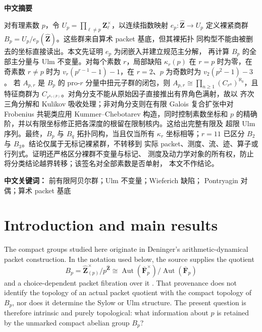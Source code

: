 \documentclass[11pt]{article}
\theoremstyle{definition}
\begin{document}
\begin{center}
\textbf{中文摘要}
\end{center}
\begingroup\small
\noindent
对有理素数 $p$，令
$U_p=\prod_{\ell\ne p}\mathbf Z_\ell^\times$，以连续指数映射
$e_p:\widehat{\mathbf Z}\to U_p$ 定义裸紧商群
$B_p=U_p/e_p(\widehat{\mathbf Z})$。这些群来自算术 packet 基底，但其裸拓扑
同构型不能由被删去的坐标直接读出。本文先证明 $e_p$ 为闭嵌入并建立规范主分解，
再计算 $B_p$ 的全部主分量与 Ulm 不变量。对每个素数 $r$，局部缺陷
$\kappa_r(p)$ 在 $r=p$ 时为零，在奇素数 $r\ne p$ 时为
$v_r(p^{r-1}-1)-1$，在 $r=2$、$p$ 为奇数时为 $v_2(p^2-1)-3$。
若 $A_{p,r}$ 是 $B_p$ 的 pro-$r$ 分量中扭元子群的闭包，则
$A_{p,r}\cong\prod_{n\ge1}(C_{r^n})^{\aleph_0}$，且特征商群为
$C_{r^{\kappa_r(p)}}$。对角分支不能从原始因子直接推出有界角色满射，故以
齐次三角分解和 Kulikov 吸收处理；非对角分支则在有限 Galois 复合扩张中对
Frobenius 共轭类应用 Kummer--Chebotarev 构造，同时控制素数坐标和
$p$ 的精确阶，并以有限坐标修正把各深度的根留在限制核内。这给出完整有限及
超限 Ulm 序列。最终，$B_p$ 与 $B_q$ 拓扑同构，当且仅当所有 $\kappa_r$
坐标相等；$r=11$ 已区分 $B_2$ 与 $B_3$。结论仅属于无标记裸紧群，不转移到
实际 packet、测度、流、迹、算子或行列式。证明还严格区分裸群不变量与标记、
测度及动力学对象的所有权，防止将分类结论越界转移；该签名对全部素数是否单射，
本文不作结论。

\medskip
\noindent\textbf{中文关键词：} 前有限阿贝尔群；Ulm 不变量；Wieferich 缺陷；
Pontryagin 对偶；算术 packet 基底
\endgroup

\section{Introduction and main results}\label{sec:introduction}

The compact groups studied here originate in Deninger's arithmetic-dynamical
packet construction.  In the notation used below, the source supplies the
quotient
\[
 B_p=\widehat{\mathbf Z}_{(p)}^{\times}/p^{\widehat{\mathbf Z}}
     \cong \operatorname{Aut}(\overline{\mathbf F}_p^{\times})/
             \operatorname{Aut}(\overline{\mathbf F}_p)
\]
and a choice-dependent packet fibration over it
\citep[equations~(38)--(40), Section~6, and Theorem~6.1]{Deninger2020}.
That provenance does not identify the topology of an actual packet quotient
with the compact topology of $B_p$, nor does it determine the Sylow or Ulm
structure.  The present question is therefore intrinsic and purely
topological: what information about $p$ is retained by the unmarked compact
abelian group $B_p$?
\end{document}
